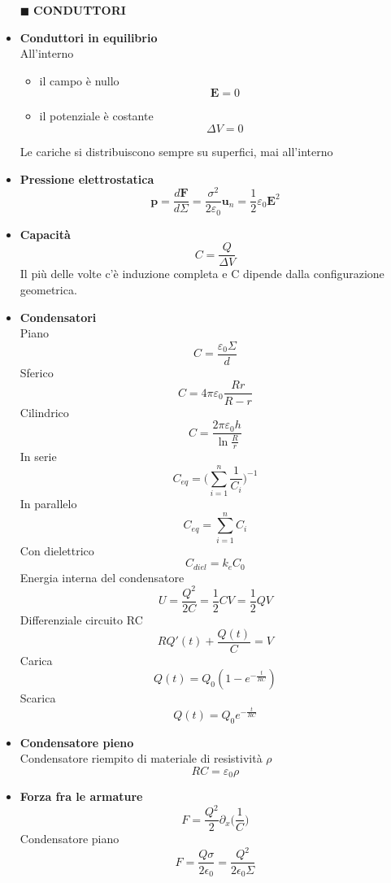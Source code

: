 \documentclass{book}
\newcommand{\g}{\textbf}
\newcommand{\h}{\mathbf}
\newcommand{\e}{\begin{equation}}
\newcommand{\ex}{\end{equation} }
\renewcommand{\it}{\item[$\cdot$]}
\begin{document}
\begin{multicols}{4}
\begin{itemize}
\hline
\item [$\blacksquare$] \g{CONDUTTORI}
    \it \g{Conduttori in equilibrio} \\
    All’interno
    \begin{itemize}
        \item il campo è nullo \e{\h{E}=0} \ex
        \item il potenziale è costante \e{\Delta V=0} \ex
    \end{itemize}
    Le cariche si distribuiscono sempre su superfici, mai all’interno
    \it \g{Pressione elettrostatica}
        \e{\h{p}=\frac{d\h{F}}{d\Sigma}=\frac{\sigma^2}{2\varepsilon_0}\h{u}_n=\frac{1}{2}\varepsilon_0 \h{E}^2} \ex
    \it \g{Capacità}
        \e{C=\frac{Q}{\Delta V}} \ex
        Il più delle volte c'è induzione completa e C dipende dalla configurazione geometrica.
    \it \g{Condensatori} \\
    Piano
        \e{C=\frac{\varepsilon_0 \Sigma}{d}} \ex
    Sferico
        \e{C=4\pi\varepsilon_0\frac{Rr}{R-r}} \ex
    Cilindrico
        \e{C=\frac{2\pi\varepsilon_0 h}{\ln \frac{R}{r}}} \ex
    In serie 
        \e{C_{eq}=\biggl( \sum_{i=1}^n \frac{1}{C_i} \biggr)^{-1}} \ex
    In parallelo
        \e{C_{eq}= \sum_{i=1}^n C_i} \ex
    Con dielettrico
        \e{C_{diel}=k_e C_0} \ex
    Energia interna del condensatore
        \e{U=\frac{Q^2}{2C}=\frac{1}{2}CV=\frac{1}{2}QV} \ex
    Differenziale circuito RC
        \e{RQ'(t)+\frac{Q(t)}{C}=V} \ex
    Carica
        \e{Q(t)=Q_0(1-e^{-\frac{t}{RC}})} \ex
    Scarica
        \e{Q(t)=Q_0 e^{-\frac{t}{RC}}} \ex
    \it \g{Condensatore pieno} \\
        Condensatore riempito di materiale di resistività $\rho$
        \e{RC=\varepsilon_0\rho} \ex
    \it \g{Forza fra le armature}
        \e{F=\frac{Q^2}{2}\partial_x \biggl(\frac{1}{C}\biggr)}\ex
        Condensatore piano
        \e{F=\frac{Q\sigma}{2\epsilon_0}=\frac{Q^2}{2\epsilon_0\Sigma}} \ex


\end{itemize}
\end{multicols}
\end{document}
